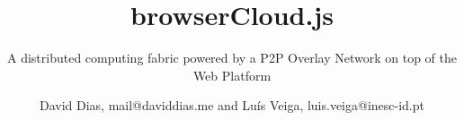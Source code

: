 \documentclass[9.5pt,twocolumn]{./llncs2e/llncs}
\begin{document}
\title{browserCloud.js}

\subtitle{A distributed computing fabric powered by a P2P Overlay Network on top of the Web Platform}
\author{David Dias, mail@daviddias.me and Lu\'{i}s Veiga, luis.veiga@inesc-id.pt}


\maketitle










\tiny


\end{document}
